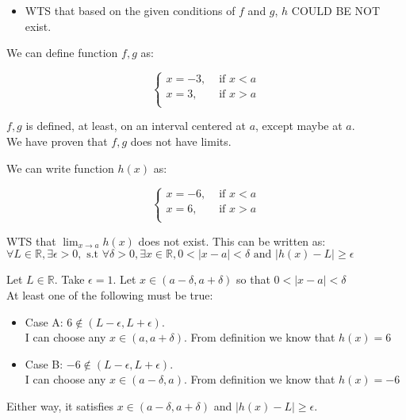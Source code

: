 \documentclass[12pt]{exam}
\newcommand {\DS} [1] {${\displaystyle #1}$}
\newcommand{\R}{\mathbb{R}}
\begin{document}
\begin{enumerate}
\begin{itemize}
	\item WTS that based on the given conditions of $f$ and $g$, $h$ COULD BE NOT exist.
\end{itemize}


We can define function $f, g$ as: 

$$
\begin{cases}
	x = -3, &\text{ if }x < a\\
	x = 3, &\text{ if } x > a\\
\end{cases}
$$

$f, g$ is defined, at least, on an interval centered at $a$, except maybe at $a$.\\

We have proven that $f, g$ does not have limits.

We can write function $h(x)$ as:

$$
\begin{cases}
	x = -6, &\text{ if }x < a\\
	x = 6, &\text{ if } x > a\\
\end{cases}
$$

WTS that \DS{\lim_{x \to a} h(x)} does not exist.
This can be written as: $\forall L \in \R, \exists \epsilon > 0, \mbox{ s.t } \forall \delta > 0, \exists x \in \R,
 0 < |x - a| < \delta \mbox{ and } |h(x) - L| \geq \epsilon$

Let $L \in \R$. Take $\epsilon = 1$. Let $x \in (a - \delta, a + \delta)$ so that $0 < |x - a| < \delta$\\
At least one of the following must be true:

\begin{itemize}
	\item Case A: $6 \notin (L - \epsilon, L + \epsilon).$ \\ 
	I can choose any $x \in (a, a + \delta)$. From definition we know that $h(x) = 6$
\end{itemize}

\begin{itemize}
	\item Case B: $-6 \notin (L - \epsilon, L + \epsilon).$ \\ 
	I can choose any $x \in (a - \delta, a )$. From definition we know that $h(x) = -6$
\end{itemize}

Either way, it satisfies $x \in (a - \delta, a + \delta)$ and $|h(x) - L| \geq \epsilon$. \\


\end{enumerate}
\end{document}

